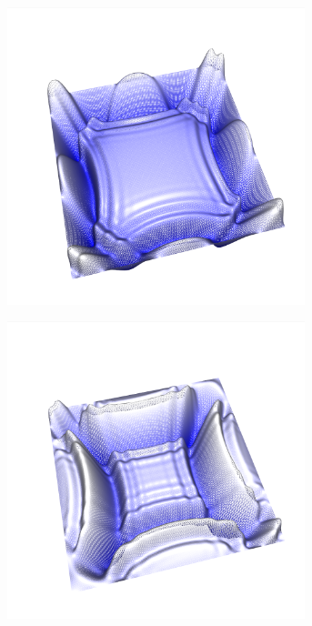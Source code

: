 \documentclass[crop=false,10pt,ngerman]{standalone}
\begin{document}
\begin{figure}[h]
        \begin{subfigure}[b]{0.24\textwidth}
          \center
          \includegraphics[trim={2cm 1.5cm 1.2cm 1.0cm},clip,width=0.95\textwidth]{images/quad_wave_4.png}
          \caption{}
        \end{subfigure}
        \begin{subfigure}[b]{0.24\textwidth}
          \center
          \includegraphics[trim={2cm 1.5cm 1.2cm 1.0cm},clip,width=0.95\textwidth]{images/quad_wave_5.png}

\end{subfigure}
\end{figure}
\end{document}
